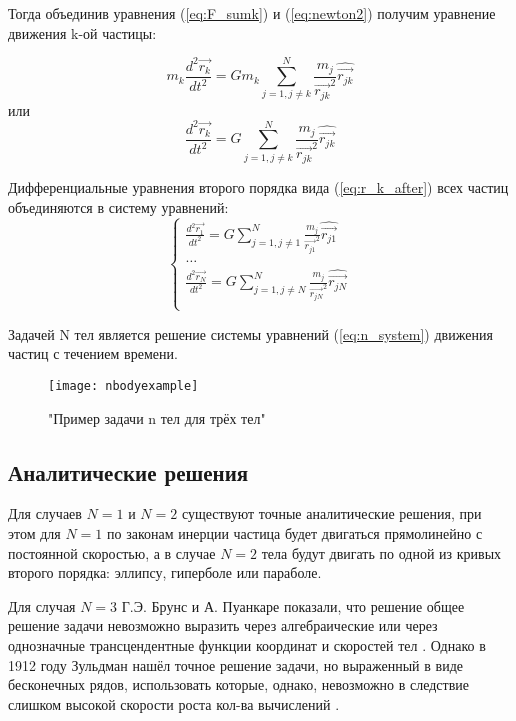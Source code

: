 Тогда объединив уравнения (\ref{eq:F_sumk}) и (\ref{eq:newton2}) получим уравнение движения k-ой частицы:
 
 \begin{equation}
 	\label{eq:r_k_before}
 	m_k\frac{d^2\vec{r_k}}{dt^2} = Gm_k\sum_{j=1, j \neq k}^{N}{\frac{m_j}{\vec{r_{jk}}^2}\hat{\vec{r_{jk}}}}
 \end{equation}
 или
 \begin{equation}
 	\label{eq:r_k_after}
 	\frac{d^2\vec{r_k}}{dt^2} = G\sum_{j=1, j \neq k}^{N}{\frac{m_j}{\vec{r_{jk}}^2}\hat{\vec{r_{jk}}}}
 \end{equation}
 
 Дифференциальные уравнения второго порядка вида (\ref{eq:r_k_after}) всех частиц объединяются в систему уравнений:
  \begin{equation}
 	\label{eq:n_system}
 	\begin{cases}
 		\frac{d^2\vec{r_1}}{dt^2} = G\sum_{j=1, j \neq 1}^{N}{\frac{m_j}{\vec{r_{j1}}^2}\hat{\vec{r_{j1}}}} \\
 		\dots \\
 		\frac{d^2\vec{r_N}}{dt^2} = G\sum_{j=1, j \neq N}^{N}{\frac{m_j}{\vec{r_{jN}}^2}\hat{\vec{r_{jN}}}} \\
 	\end{cases}
 \end{equation}

Задачей N тел является решение системы уравнений (\ref{eq:n_system}) движения частиц с течением времени.

\begin{figure}[h]
	\centering
	\texttt{[image: nbodyexample]}
	\caption{"Пример задачи n тел для трёх тел"}
	\label{fig:nbodyexample}
\end{figure}

\subsection{Аналитические решения}
Для случаев $N = 1$ и $N = 2$ существуют точные аналитические решения, при этом для $N = 1$ по законам инерции частица будет двигаться прямолинейно с постоянной скоростью, а в случае $N = 2$ тела будут двигать по одной из кривых второго порядка: эллипсу, гиперболе или параболе.

Для случая $N = 3$ Г.Э. Брунс и А. Пуанкаре показали, что решение общее решение задачи невозможно выразить через алгебраические или через однозначные трансцендентные функции координат и скоростей тел \cite{markeev}. Однако в 1912 году Зульдман нашёл точное решение задачи, но выраженный в виде бесконечных рядов, использовать которые, однако, невозможно в следствие слишком высокой скорости роста кол-ва вычислений \cite{markeev}.

